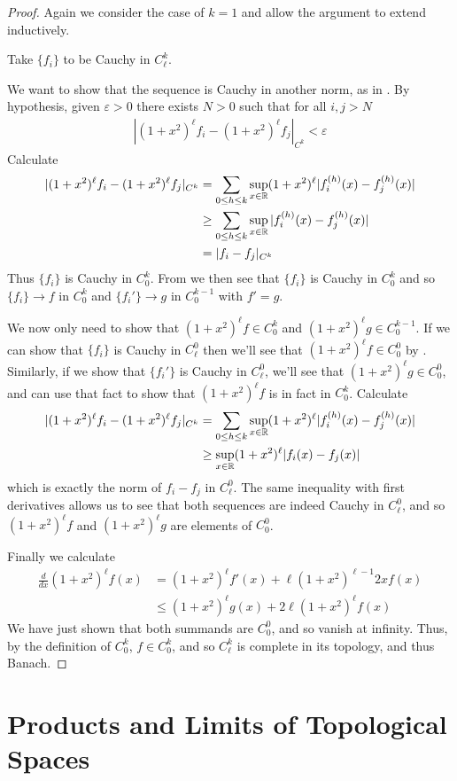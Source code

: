       \begin{proof}
        Again we consider the case of $k=1$ and allow the argument to extend inductively.

        Take $\{f_i\}$ to be Cauchy in $C^k_\ell$.

        We want to show that the sequence is Cauchy in another norm, as in .
        By hypothesis, given $\varepsilon>0$ there exists $N>0$ such that for all $i,j>N$
        \begin{align*}
          |(1+x^2)^\ell f_i - (1+x^2)^\ell f_j|_{C^k} < \varepsilon
        \end{align*}
        Calculate
        \begin{align*}
          |(1+x^2)^\ell f_i - (1+x^2)^\ell f_j|_{C^k}
          &= \sum_{0\le h\le k}\sup_{x\in\mathbb{R}}(1+x^2)^\ell|f_i^{(h)}(x)-f_j^{(h)}(x)|\\
          &\ge \sum_{0\le h\le k}\sup_{x\in\mathbb{R}}|f_i^{(h)}(x)-f_j^{(h)}(x)|\\
          &= |f_i-f_j|_{C^k}
        \end{align*}
        Thus $\{f_i\}$ is Cauchy in $C^k_0$.
        From  we then see that $\{f_i\}$ is Cauchy in $C^k_0$ and so $\{f_i\}\rightarrow f$ in $C^k_0$ and $\{f_i'\}\rightarrow g$ in $C^{k-1}_0$ with $f'=g$.

        We now only need to show that $(1+x^2)^\ell f\in C^k_0$ and $(1+x^2)^\ell g\in C^{k-1}_0$.
        If we can show that $\{f_i\}$ is Cauchy in $C^0_\ell$ then we'll see that $(1+x^2)^\ell f\in C^0_0$ by .
        Similarly, if we show that $\{f_i'\}$ is Cauchy in $C^0_\ell$, we'll see that $(1+x^2)^\ell g\in C^0_0$, and can use that fact to show that $(1+x^2)^\ell f$ is in fact in $C^k_0$.
        Calculate
        \begin{align*}
          |(1+x^2)^\ell f_i - (1+x^2)^\ell f_j|_{C^k}
          &= \sum_{0\le h\le k}\sup_{x\in\mathbb{R}}(1+x^2)^\ell|f_i^{(h)}(x)-f_j^{(h)}(x)|\\
          &\ge \sup_{x\in\mathbb{R}}(1+x^2)^\ell|f_i(x)-f_j(x)|
        \end{align*}
        which is exactly the norm of $f_i-f_j$ in $C^0_\ell$.
        The same inequality with first derivatives allows us to see that both sequences are indeed Cauchy in $C^0_\ell$, and so $(1+x^2)^\ell f$ and $(1+x^2)^\ell g$ are elements of $C^0_0$.

        Finally we calculate
        \begin{align*}
          \frac{d}{dx}(1+x^2)^\ell f(x)
          &= (1+x^2)^\ell f'(x) + \ell(1+x^2)^{\ell-1}2xf(x)\\
          &\le (1+x^2)^\ell g(x) + 2\ell(1+x^2)^\ell f(x)
        \end{align*}
        We have just shown that both summands are $C^0_0$, and so vanish at infinity.
        Thus, by the definition of $C^k_0$, $f\in C^k_0$, and so $C^k_\ell$ is complete in its topology, and thus Banach.
      \end{proof}

    \section{Products and Limits of Topological Spaces}


